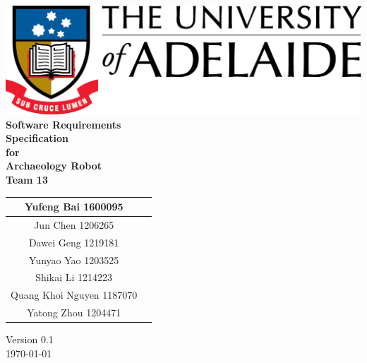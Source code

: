 \begin{center}
\includegraphics[scale=1.5]{UniLogo}\\[1cm]    
\textbf{\Huge \bfseries Software Requirements \\Specification}\\[1.5cm]
\textbf{\huge for}\\[0.5cm]


\textbf{ \huge Archaeology Robot }\\[0.3cm]
\textbf{ \huge Team 13 }\\[2cm]


\begin{tabular}{ |c | p{2cm} |}
	\hline
Yufeng Bai 1600095 & \\[.5cm] \hline
Jun Chen 1206265 & \\[.5cm] \hline
Dawei Geng 1219181 & \\[.5cm] \hline
Yunyao Yao 1203525 & \\[.5cm] \hline
Shikai Li 1214223 & \\[.5cm] \hline
Quang Khoi Nguyen 1187070  & \\[.5cm] \hline
Yatong Zhou 1204471 & \\[.5cm] \hline
\end{tabular}


\vfill

Version 0.1 \\ [0.2cm]
{\large \today}

\end{center}

